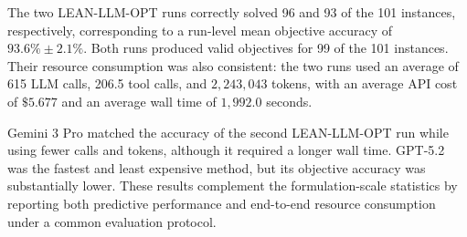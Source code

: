 \documentclass[11pt]{article}
\begin{document}
\begin{enumerate}[label=(R2.Major.\arabic*),leftmargin=*]
\begin{table}[!htbp]
\centering
\caption{Run-level objective accuracy and resource consumption on the
101-instance Large-Scale-OR benchmark.}
\label{tab:lsor-complete-runs-response}
\small
\setlength{\tabcolsep}{3.5pt}
\renewcommand{\arraystretch}{1.25}
\end{table}

The two LEAN-LLM-OPT runs correctly solved 96 and 93 of the 101 instances,
respectively, corresponding to a run-level mean objective accuracy of
$93.6\%\pm2.1\%$. Both runs produced valid objectives for 99 of the 101
instances. Their resource consumption was also consistent: the two runs used
an average of 615 LLM calls, 206.5 tool calls, and $2{,}243{,}043$ tokens,
with an average API cost of $\$5.677$ and an average wall time of
$1{,}992.0$ seconds.


Gemini 3 Pro matched the accuracy of the second LEAN-LLM-OPT run while using
fewer calls and tokens, although it required a longer wall time. GPT-5.2 was
the fastest and least expensive method, but its objective accuracy was
substantially lower. These results complement the formulation-scale statistics
by reporting both predictive performance and end-to-end resource consumption
under a common evaluation protocol.


\end{enumerate}
\end{document}
